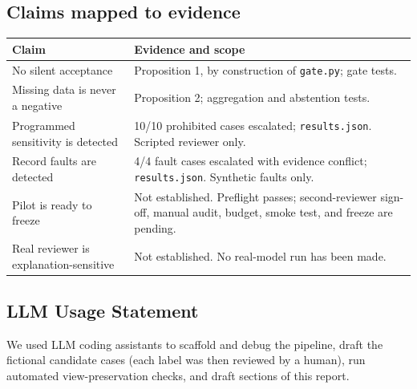 \documentclass[11pt]{article}
\newcommand{\code}[1]{\texttt{#1}}
\begin{document}
\subsection{Claims mapped to evidence}

\begin{table}[H]
\centering\small
\begin{tabularx}{\linewidth}{@{}lL@{}}
\toprule
Claim & Evidence and scope \\
\midrule
No silent acceptance & Proposition 1, by construction of \code{gate.py}; gate tests. \\
Missing data is never a negative & Proposition 2; aggregation and abstention tests. \\
Programmed sensitivity is detected & 10/10 prohibited cases escalated; \code{results.json}. Scripted reviewer only. \\
Record faults are detected & 4/4 fault cases escalated with evidence conflict; \code{results.json}. Synthetic faults only. \\
Pilot is ready to freeze & Not established. Preflight passes; second-reviewer sign-off, manual audit, budget, smoke test, and freeze are pending. \\
Real reviewer is explanation-sensitive & Not established. No real-model run has been made. \\
\bottomrule
\end{tabularx}
\end{table}

\subsection{LLM Usage Statement}

We used LLM coding assistants to scaffold and debug the pipeline, draft the fictional candidate cases (each label was then reviewed by a human), run automated view-preservation checks, and draft sections of this report.
\end{document}
